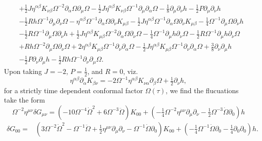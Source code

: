 \documentclass[10pt,letterpaper]{article}
\begin{document}
\begin{align}
& + \tfrac{1}{2} J \eta^{\alpha \beta} K_{\nu \beta} \Omega^{-2} \partial_{\alpha}\Omega \partial_{\mu}\Omega
 -  \tfrac{1}{2} J \eta^{\alpha \beta} K_{\nu \beta} \Omega^{-1} \partial_{\mu}\partial_{\alpha}\Omega
 -  \tfrac{1}{8} \partial_{\mu}\partial_{\nu}h
 -  \tfrac{1}{2} P \partial_{\mu}\partial_{\nu}h\nonumber\\
& -  \tfrac{1}{2} R h \Omega^{-1} \partial_{\mu}\partial_{\nu}\Omega
 -  \eta^{\alpha \beta} \Omega^{-1} \partial_{\alpha}\Omega \partial_{\nu}K_{\mu \beta}
 -  \tfrac{1}{2} J \eta^{\alpha \beta} \Omega^{-1} \partial_{\alpha}\Omega \partial_{\nu}K_{\mu \beta}
 -  \tfrac{1}{4} \Omega^{-1} \partial_{\mu}\Omega \partial_{\nu}h\nonumber\\
& -  \tfrac{1}{2} R \Omega^{-1} \partial_{\mu}\Omega \partial_{\nu}h
 + \tfrac{1}{2} J \eta^{\alpha \beta} K_{\mu \beta} \Omega^{-2} \partial_{\alpha}\Omega \partial_{\nu}\Omega
 -  \tfrac{1}{4} \Omega^{-1} \partial_{\mu}h \partial_{\nu}\Omega
 -  \tfrac{1}{2} R \Omega^{-1} \partial_{\mu}h \partial_{\nu}\Omega\nonumber\\
& + R h \Omega^{-2} \partial_{\mu}\Omega \partial_{\nu}\Omega
 + 2 \eta^{\alpha \beta} K_{\mu \beta} \Omega^{-1} \partial_{\nu}\partial_{\alpha}\Omega
 -  \tfrac{1}{2} J \eta^{\alpha \beta} K_{\mu \beta} \Omega^{-1} \partial_{\nu}\partial_{\alpha}\Omega
 + \tfrac{3}{8} \partial_{\nu}\partial_{\mu}h\nonumber\\
& -  \tfrac{1}{2} P \partial_{\nu}\partial_{\mu}h
 -  \tfrac{1}{2} R h \Omega^{-1} \partial_{\nu}\partial_{\mu}\Omega.
\end{align}
Upon taking $J=-2$, $P=\tfrac12$, and $R=0$, viz.
\begin{equation}
	\eta^{\alpha\beta}\partial_{\alpha}K_{\beta\nu} = -2\Omega^{-1}  \eta^{\alpha\beta}K_{\nu\alpha}\partial_\beta \Omega + \tfrac12 \partial_\nu h,
\end{equation}
for a strictly time dependent conformal factor $\Omega(\tau)$, we find the flucuations take the form 
\begin{equation}
	\Omega^{-2}\eta^{\mu\nu}\delta G_{\mu\nu}
=(-10 \Omega^{-4} \dot{\Omega}^2 + 6 \Omega^{-3} \ddot{\Omega}) K_{00} + (- \tfrac{1}{4} \Omega^{-2} \eta^{\mu \nu} \partial_{\mu} \partial_{\nu} -  \tfrac{1}{2} \Omega^{-3} \dot{\Omega} \partial_{0}) h
\end{equation}
\begin{align}
\delta G_{00}={}&(3 \Omega^{-2} \dot{\Omega}^2
 -  \Omega^{-1} \ddot{\Omega}
 + \tfrac{1}{2} \eta^{\mu \nu} \partial_{\mu} \partial_{\nu}
 -  \Omega^{-1} \dot{\Omega} \partial_{0}) K_{00}
 + (- \tfrac{1}{4} \Omega^{-1} \dot{\Omega} \partial_{0}
 -  \tfrac{1}{4} \partial_{0} \partial_{0}) h.
\end{align}
\end{document}
